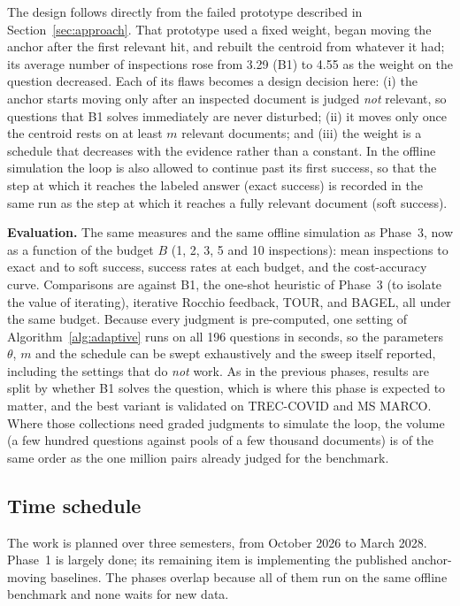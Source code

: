 \documentclass[12pt,a4paper]{article}
\begin{document}
The design follows directly from the failed prototype described in Section~\ref{sec:approach}. That prototype used a fixed weight, began moving the anchor after the first relevant hit, and rebuilt the centroid from whatever it had; its average number of inspections rose from 3.29 (B1) to 4.55 as the weight on the question decreased. Each of its flaws becomes a design decision here: (i) the anchor starts moving only after an inspected document is judged \emph{not} relevant, so questions that B1 solves immediately are never disturbed; (ii) it moves only once the centroid rests on at least $m$ relevant documents; and (iii) the weight is a schedule that decreases with the evidence rather than a constant. In the offline simulation the loop is also allowed to continue past its first success, so that the step at which it reaches the labeled answer (exact success) is recorded in the same run as the step at which it reaches a fully relevant document (soft success).

\textbf{Evaluation.} The same measures and the same offline simulation as Phase~3, now as a function of the budget $B$ (1, 2, 3, 5 and 10 inspections): mean inspections to exact and to soft success, success rates at each budget, and the cost-accuracy curve. Comparisons are against B1, the one-shot heuristic of Phase~3 (to isolate the value of iterating), iterative Rocchio feedback, TOUR, and BAGEL, all under the same budget. Because every judgment is pre-computed, one setting of Algorithm~\ref{alg:adaptive} runs on all 196 questions in seconds, so the parameters $\theta$, $m$ and the schedule can be swept exhaustively and the sweep itself reported, including the settings that do \emph{not} work. As in the previous phases, results are split by whether B1 solves the question, which is where this phase is expected to matter, and the best variant is validated on TREC-COVID and MS MARCO. Where those collections need graded judgments to simulate the loop, the volume (a few hundred questions against pools of a few thousand documents) is of the same order as the one million pairs already judged for the benchmark.

\subsection{Time schedule}

The work is planned over three semesters, from October 2026 to March 2028. Phase~1 is largely done; its remaining item is implementing the published anchor-moving baselines. The phases overlap because all of them run on the same offline benchmark and none waits for new data.
\end{document}
